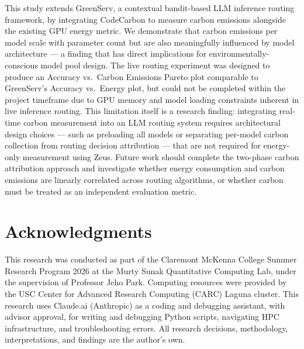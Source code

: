 \documentclass[12pt]{article}
\begin{document}
This study extends GreenServ, a contextual bandit-based LLM inference
routing framework, by integrating CodeCarbon to measure carbon emissions
alongside the existing GPU energy metric. We demonstrate that carbon
emissions per model scale with parameter count but are also meaningfully
influenced by model architecture --- a finding that has direct implications
for environmentally-conscious model pool design. The live routing experiment
was designed to produce an Accuracy vs.\ Carbon Emissions Pareto plot
comparable to GreenServ's Accuracy vs.\ Energy plot, but could not be
completed within the project timeframe due to GPU memory and model loading
constraints inherent in live inference routing. This limitation itself is a
research finding: integrating real-time carbon measurement into an LLM
routing system requires architectural design choices --- such as preloading
all models or separating per-model carbon collection from routing decision
attribution --- that are not required for energy-only measurement using Zeus.
Future work should complete the two-phase carbon attribution approach and
investigate whether energy consumption and carbon emissions are linearly
correlated across routing algorithms, or whether carbon must be treated as
an independent evaluation metric.

\section*{Acknowledgments}

This research was conducted as part of the Claremont McKenna College Summer
Research Program 2026 at the Murty Sunak Quantitative Computing Lab, under
the supervision of Professor Jeho Park. Computing resources were provided by
the USC Center for Advanced Research Computing (CARC) Laguna cluster. This
research uses Claude.ai (Anthropic) as a coding and debugging assistant,
with advisor approval, for writing and debugging Python scripts, navigating
HPC infrastructure, and troubleshooting errors. All research decisions,
methodology, interpretations, and findings are the author's own.
\end{document}

